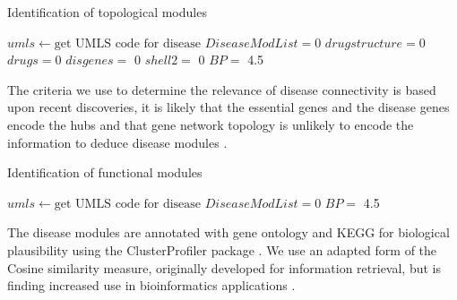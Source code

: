 \documentclass[a4paper,8pt,twocolumn,5p]{elsarticle}
\begin{document}
\begin{algorithm}
\caption{Identification of topological modules}\label{alg2}
\begin{algorithmic}[1]
\scriptsize
{}
         \State \hspace{\algorithmicindent} $umls \gets \mbox {get UMLS code for disease}$
      \State \hspace{\algorithmicindent} $DiseaseModList = 0$
      \State \hspace{\algorithmicindent} $drugstructure =0$
      \State \hspace{\algorithmicindent} $drugs =0$
      \State \hspace{\algorithmicindent} $disgenes =$ 0
      \State \hspace{\algorithmicindent} $shell2 =$ 0
      \State \hspace{\algorithmicindent} $BP =$ 4.5

\EndProcedure
\normalsize
\end{algorithmic}
\end{algorithm}

The criteria we use to determine the relevance of disease connectivity is based upon recent discoveries,   it is likely that the essential genes and the disease genes encode the hubs \citep{Vidal2011} and that gene network topology is unlikely to encode the information to deduce disease modules \citep{Ghiassian2015}. 

\begin{algorithm}
\caption{Identification of functional modules}\label{alg3}
\begin{algorithmic}[1]
\scriptsize
{}
         \State \hspace{\algorithmicindent} $umls \gets \mbox {get UMLS code for disease}$
      \State \hspace{\algorithmicindent} $DiseaseModList = 0$
      \State \hspace{\algorithmicindent} $BP =$ 4.5

\EndProcedure
\normalsize
\end{algorithmic}
\end{algorithm}


The disease modules are annotated with gene ontology and KEGG for biological plausibility using the ClusterProfiler package \citep{Yu2012}. We use an adapted form of the Cosine similarity measure, originally developed for information retrieval, but is finding increased use in bioinformatics applications \citep{Sun2014}. 
\end{document}
